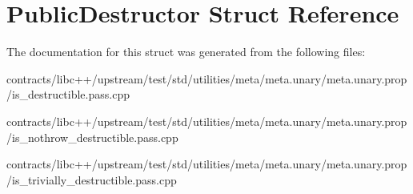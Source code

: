 \hypertarget{struct_public_destructor}{}\section{Public\+Destructor Struct Reference}
\label{struct_public_destructor}


The documentation for this struct was generated from the following files\+:\begin{DoxyCompactItemize}
\item 
contracts/libc++/upstream/test/std/utilities/meta/meta.\+unary/meta.\+unary.\+prop/is\+\_\+destructible.\+pass.\+cpp\item 
contracts/libc++/upstream/test/std/utilities/meta/meta.\+unary/meta.\+unary.\+prop/is\+\_\+nothrow\+\_\+destructible.\+pass.\+cpp\item 
contracts/libc++/upstream/test/std/utilities/meta/meta.\+unary/meta.\+unary.\+prop/is\+\_\+trivially\+\_\+destructible.\+pass.\+cpp\end{DoxyCompactItemize}
